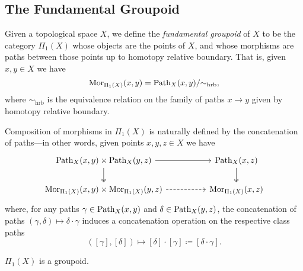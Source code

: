 \subsection{The Fundamental Groupoid}

\begin{definition}
    \label{def:fundamental-groupoid}
    Given a topological space \(X\), we define the \emph{fundamental groupoid} of
    \(X\) to be the category \(\Pi_1(X)\) whose objects are the points of \(X\), and
    whose morphisms are paths between those points up to homotopy relative boundary.
    That is, given \(x, y \in X\) we have
    \[
        \operatorname{Mor}_{\Pi_1(X)}(x, y) = \operatorname{Path}_X(x, y)/{\sim_{\text{hrb}}},
    \]
    where \(\sim_{\text{hrb}}\) is the equivalence relation on the family of paths
    \(x \to y\) given by homotopy relative boundary.

    Composition of morphisms in \(\Pi_1(X)\) is naturally defined by the
    concatenation of paths---in other words, given points \(x, y, z \in X\) we
    have
    \[
        \begin{tikzcd}
            {\Path_X(x, y) \times \Path_X(y, z)}
            \ar[d, two heads] \ar[rr]
            &&{\Path_X(x, z)} \ar[d, two heads]
            \\
            {\Hom_{\Pi_1(X)}(x, y) \times \Hom_{\Pi_1(X)}(y, z)}
            \ar[rr, dashed]
            &&{\Hom_{\Pi_1(X)}(x, z)}
        \end{tikzcd}
    \]
    where, for any paths \(\gamma \in \operatorname{Path}_X(x, y)\) and \(\delta \in \operatorname{Path}_X(y,
    z)\), the concatenation of paths \((\gamma, \delta) \mapsto \delta \cdot \gamma\) induces
    a concatenation operation on the respective class paths
    \[
        ([\gamma], [\delta]) \longmapsto
        [\delta] \cdot [\gamma] \coloneq [\delta \cdot \gamma].
    \]
\end{definition}

\begin{corollary}
    \label{cor:Pi1-is-groupoid}
    \(\Pi_1(X)\) is a groupoid.
\end{corollary}

